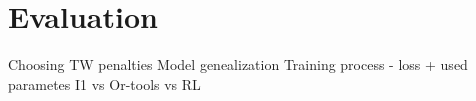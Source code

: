 \chapter{Evaluation}
Choosing TW penalties
Model genealization
Training process - loss + used parametes
I1 vs Or-tools vs RL